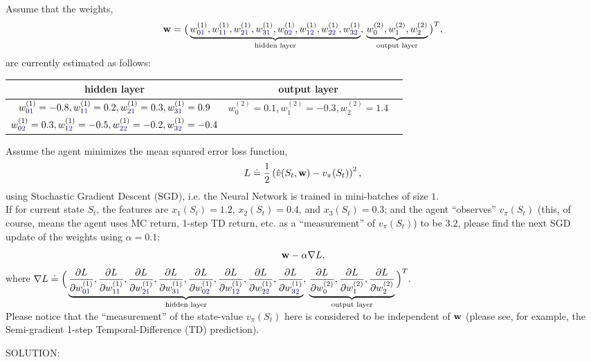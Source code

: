 \documentclass[12pt]{letter}
\begin{document}
Assume that the weights,
$${\bf w}=\big(
\underbrace{w^{(1)}_{0{\color{blue}1}}, w^{(1)}_{1{\color{blue}1}},  w^{(1)}_{2{\color{blue}1}}, w^{(1)}_{3{\color{blue}1}},
w^{(1)}_{0{\color{blue}2}}, w^{(1)}_{1{\color{blue}2}}, w^{(1)}_{2{\color{blue}2}}, w^{(1)}_{3{\color{blue}2}}}_{\text{hidden layer}},\,
\underbrace{w^{(2)}_{0}, w^{(2)}_{1}, w^{(2)}_{2}}_{\text{output layer}}
\big)^T,$$
are currently estimated as follows:
{\footnotesize
{\doublespacing
\begin{center}
\begin{tabular}{ |c|c|c| }
\hline
 hidden layer & output layer\\
\hline
 $w^{(1)}_{0{\color{blue}1}} = -0.8, w^{(1)}_{1{\color{blue}1}}= 0.2,  w^{(1)}_{2{\color{blue}1}} = 0.3, w^{(1)}_{3{\color{blue}1}} = 0.9$ & \multirow{2}{*}{$w^{(2)}_{0} = 0.1, w^{(2)}_{1} = -0.3, w^{(2)}_{2}=1.4$}\\
 $w^{(1)}_{0{\color{blue}2}} = 0.3, w^{(1)}_{1{\color{blue}2}} = -0.5, w^{(1)}_{2{\color{blue}2}} = -0.2, w^{(1)}_{3{\color{blue}2}} = -0.4$  & \\
\hline
\end{tabular}
\end{center}
}}\vspace{0.4cm}

Assume the agent minimizes the mean squared error loss function,
$$L\doteq \frac{1}{2} \left(\hat{v}(S_t,{\bf w})-v_\pi(S_t)\right)^2,$$
using Stochastic Gradient Descent (SGD), i.e. the Neural Network is trained in mini-batches of size $1$.\medskip\\
If for current state $S_t$, the features are $x_{1}(S_t)=1.2$, $x_2(S_t)=0.4$, and $x_3(S_t)=0.3$; and the agent ``observes'' $v_\pi(S_t)$ (this, of course, means the agent uses MC return, 1-step TD return, etc. as a ``measurement'' of $v_\pi(S_t)$) to be $3.2$, please find the next SGD update of the weights using $\alpha=0.1$:
$${\bf w}-\alpha \nabla L,$$
where $\nabla L \doteq \Big(
\underbrace{\frac{\partial L}{\partial w^{(1)}_{0{\color{blue}1}}}, \frac{\partial L}{\partial w^{(1)}_{1{\color{blue}1}}},  \frac{\partial L}{\partial w^{(1)}_{2{\color{blue}1}}}, \frac{\partial L}{\partial w^{(1)}_{3{\color{blue}1}}},
\frac{\partial L}{\partial w^{(1)}_{0{\color{blue}2}}}, \frac{\partial L}{\partial w^{(1)}_{1{\color{blue}2}}}, \frac{\partial L}{\partial w^{(1)}_{2{\color{blue}2}}}, \frac{\partial L}{\partial w^{(1)}_{3{\color{blue}2}}}}_{\text{hidden layer}},\,
\underbrace{\frac{\partial L}{\partial w^{(2)}_{0}}, \frac{\partial L}{\partial w^{(2)}_{1}}, \frac{\partial L}{\partial w^{(2)}_{2}}}_{\text{output layer}}
\Big)^T.$\medskip\\
Please notice that the ``measurement'' of the state-value $v_\pi(S_t)$ here is considered to be independent of ${\bf w}$ (please see, for example, the Semi-gradient 1-step Temporal-Difference (TD) prediction).

SOLUTION:
\end{document}
